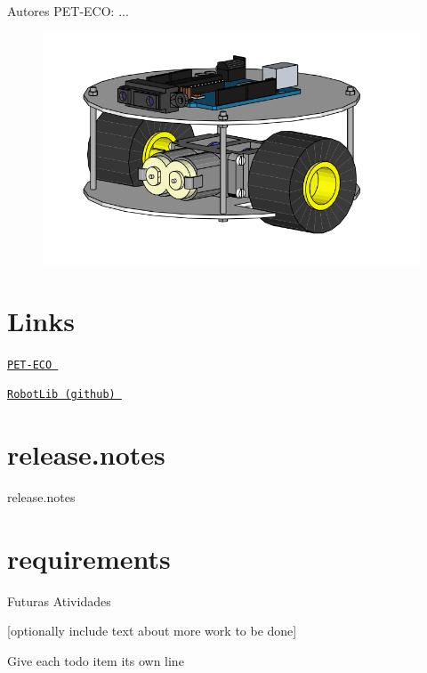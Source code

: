\begin{DoxyAuthor}{Autores}
P\-E\-T-\/\-E\-C\-O\-: ...
\end{DoxyAuthor}

\begin{figure}[htb]
	\centering
	\includegraphics[width=.8\textwidth]{img/modelo3d.png}
\end{figure}


 \hypertarget{index_Links}{}\section{Links}\label{index_Links}
\href{http://dainf.ct.utfpr.edu.br/peteco/}{\tt P\-E\-T-\/\-E\-C\-O } 

\href{https://github.com/anderson-/RobotLib}{\tt Robot\-Lib (github) } 



 \hypertarget{index_notes}{}\section{release.\-notes}\label{index_notes}
release.\-notes 

 \hypertarget{index_requirements}{}\section{requirements}\label{index_requirements}

\begin{DoxyVerbInclude}
\end{DoxyVerbInclude}
 

 \begin{DoxyRefDesc}{Futuras Atividades}
\item[\hyperlink{todo__todo000001}{Futuras Atividades}]\mbox{[}optionally include text about more work to be done\mbox{]} 

Give each todo item its own line\end{DoxyRefDesc}
